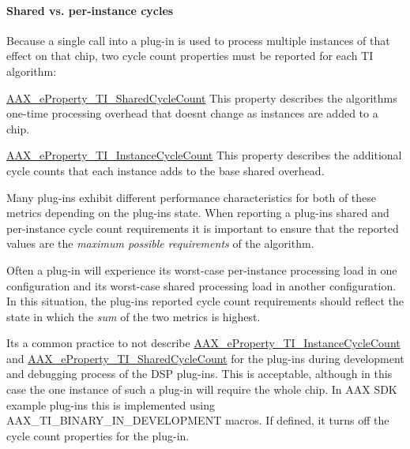 \hypertarget{a00832_subsubsection__shared_vs_perinstance_cycles_}{}\paragraph{Shared vs. per-\/instance cycles}\label{a00832_subsubsection__shared_vs_perinstance_cycles_}
 Because a single call into a plug-\/in is used to process multiple instances of that effect on that chip, two cycle count properties must be reported for each TI algorithm\+: 
\begin{DoxyEnumerate}
\item \mbox{\hyperlink{a00662_a13e384f22825afd3db6d68395b79ce0da3e5b289333ba49f5a33de40d89fa4ade}{A\+A\+X\+\_\+e\+Property\+\_\+\+T\+I\+\_\+\+Shared\+Cycle\+Count}}  This property describes the algorithm\textquotesingle{}s one-\/time processing overhead that doesn\textquotesingle{}t change as instances are added to a chip.  
\item \mbox{\hyperlink{a00662_a13e384f22825afd3db6d68395b79ce0da5d8e5be9f3698a9c67a578c29da66405}{A\+A\+X\+\_\+e\+Property\+\_\+\+T\+I\+\_\+\+Instance\+Cycle\+Count}}  This property describes the additional cycle counts that each instance adds to the base shared overhead.  
\end{DoxyEnumerate}

Many plug-\/ins exhibit different performance characteristics for both of these metrics depending on the plug-\/in\textquotesingle{}s state. When reporting a plug-\/in\textquotesingle{}s shared and per-\/instance cycle count requirements it is important to ensure that the reported values are the {\itshape maximum possible requirements} of the algorithm.

Often a plug-\/in will experience its worst-\/case per-\/instance processing load in one configuration and its worst-\/case shared processing load in another configuration. In this situation, the plug-\/in\textquotesingle{}s reported cycle count requirements should reflect the state in which the {\itshape sum} of the two metrics is highest.

It\textquotesingle{}s a common practice to not describe \mbox{\hyperlink{a00662_a13e384f22825afd3db6d68395b79ce0da5d8e5be9f3698a9c67a578c29da66405}{A\+A\+X\+\_\+e\+Property\+\_\+\+T\+I\+\_\+\+Instance\+Cycle\+Count}} and \mbox{\hyperlink{a00662_a13e384f22825afd3db6d68395b79ce0da3e5b289333ba49f5a33de40d89fa4ade}{A\+A\+X\+\_\+e\+Property\+\_\+\+T\+I\+\_\+\+Shared\+Cycle\+Count}} for the plug-\/ins during development and debugging process of the D\+SP plug-\/ins. This is acceptable, although in this case the one instance of such a plug-\/in will require the whole chip. In A\+AX S\+DK example plug-\/ins this is implemented using {\ttfamily A\+A\+X\+\_\+\+T\+I\+\_\+\+B\+I\+N\+A\+R\+Y\+\_\+\+I\+N\+\_\+\+D\+E\+V\+E\+L\+O\+P\+M\+E\+NT} macros. If defined, it turns off the cycle count properties for the plug-\/in.

